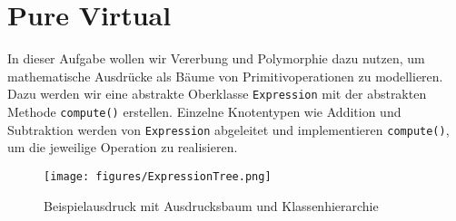 \section{Pure Virtual}
In dieser Aufgabe wollen wir Vererbung und Polymorphie dazu nutzen, um mathematische Ausdrücke als Bäume von Primitivoperationen zu modellieren.
Dazu werden wir eine abstrakte Oberklasse \lstinline{Expression} mit der abstrakten Methode \lstinline{compute()} erstellen.
Einzelne Knotentypen wie Addition und Subtraktion werden von \lstinline{Expression} abgeleitet und implementieren \lstinline{compute()}, um die jeweilige Operation zu realisieren.
\begin{figure}[h]
\begin{center}
	\texttt{[image: figures/ExpressionTree.png]}\\
	\caption{Beispielausdruck mit Ausdrucksbaum und Klassenhierarchie}
\end{center}
\end{figure}


